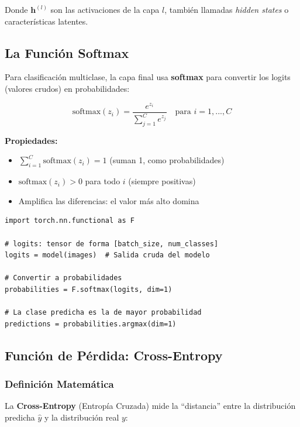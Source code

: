 \documentclass[12pt,a4paper]{article}
\begin{document}
Donde $\mathbf{h}^{(l)}$ son las activaciones de la capa $l$, también llamadas \textit{hidden states} o características latentes.

\subsection{La Función Softmax}

Para clasificación multiclase, la capa final usa \textbf{softmax} para convertir los logits (valores crudos) en probabilidades:

\begin{equation}
\text{softmax}(z_i) = \frac{e^{z_i}}{\sum_{j=1}^{C} e^{z_j}} \quad \text{para } i = 1, ..., C
\end{equation}

\textbf{Propiedades:}
\begin{itemize}
    \item $\sum_{i=1}^{C} \text{softmax}(z_i) = 1$ (suman 1, como probabilidades)
    \item $\text{softmax}(z_i) > 0$ para todo $i$ (siempre positivas)
    \item Amplifica las diferencias: el valor más alto domina
\end{itemize}

\begin{lstlisting}[caption={Implementación de Softmax en PyTorch}]
import torch.nn.functional as F

# logits: tensor de forma [batch_size, num_classes]
logits = model(images)  # Salida cruda del modelo

# Convertir a probabilidades
probabilities = F.softmax(logits, dim=1)

# La clase predicha es la de mayor probabilidad
predictions = probabilities.argmax(dim=1)
\end{lstlisting}

\subsection{Función de Pérdida: Cross-Entropy}

\subsubsection{Definición Matemática}

La \textbf{Cross-Entropy} (Entropía Cruzada) mide la ``distancia'' entre la distribución predicha $\hat{y}$ y la distribución real $y$:
\end{document}
